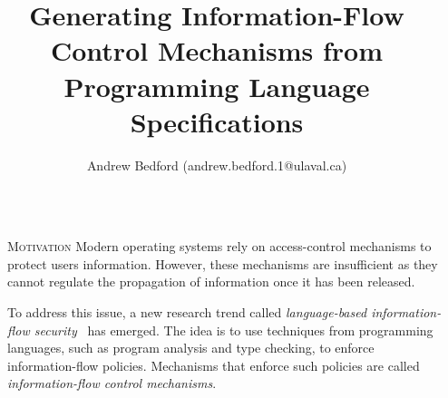 \documentclass[final]{beamer}
\title{Generating Information-Flow Control Mechanisms from\\ Programming Language Specifications} %
\author{Andrew Bedford (andrew.bedford.1@ulaval.ca)} %
\institute{Laval University, Canada} %
\newlength{\sepwid}
\newlength{\onecolwid}
\begin{document}

\setlength{\belowcaptionskip}{2ex} %
\setlength\belowdisplayshortskip{2ex} %

\begin{frame}[fragile] %

\begin{columns}[t] %

\begin{column}{\sepwid}\end{column} %

\begin{column}{\onecolwid} %



\begin{block}{\textsc{Motivation}}
    Modern operating systems rely on access-control mechanisms to protect users information. However, these mechanisms are insufficient as they cannot regulate the propagation of information once it has been released. 
    
    \hspace{1.5cm}To address this issue, a new research trend called \emph{language-based information-flow security}~\cite{DBLP:journals/jsac/SabelfeldM03} has emerged. The idea is to use techniques from programming languages, such as program analysis and type checking, to enforce information-flow policies. Mechanisms that enforce such policies are called \emph{information-flow control mechanisms}. 
\end{block}


\end{column}
\end{columns}
\end{frame}
\end{document}
